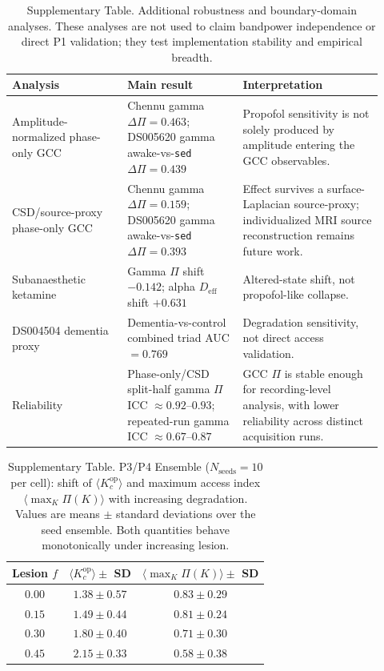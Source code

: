 \documentclass[11pt]{article}
\newcommand{\Deff}{D_{\mathrm{eff}}}
\begin{document}
\begin{table}[h]
\centering
\caption{Supplementary Table. Additional robustness and boundary-domain analyses. These analyses are not used to claim bandpower independence or direct P1 validation; they test implementation stability and empirical breadth.}
\label{tab:additional-controls}
\small
\begin{tabular}{p{0.29\linewidth}p{0.29\linewidth}p{0.34\linewidth}}
\toprule
Analysis & Main result & Interpretation \\
\midrule
Amplitude-normalized phase-only GCC & Chennu gamma $\Delta\Pi=0.463$; DS005620 gamma awake-vs-\texttt{sed} $\Delta\Pi=0.439$ & Propofol sensitivity is not solely produced by amplitude entering the GCC observables. \\
CSD/source-proxy phase-only GCC & Chennu gamma $\Delta\Pi=0.159$; DS005620 gamma awake-vs-\texttt{sed} $\Delta\Pi=0.393$ & Effect survives a surface-Laplacian source-proxy; individualized MRI source reconstruction remains future work. \\
Subanaesthetic ketamine & Gamma $\Pi$ shift $-0.142$; alpha $\Deff$ shift $+0.631$ & Altered-state shift, not propofol-like collapse. \\
DS004504 dementia proxy & Dementia-vs-control combined triad AUC $=0.769$ & Degradation sensitivity, not direct access validation. \\
Reliability & Phase-only/CSD split-half gamma $\Pi$ ICC $\approx0.92$--$0.93$; repeated-run gamma ICC $\approx0.67$--$0.87$ & GCC $\Pi$ is stable enough for recording-level analysis, with lower reliability across distinct acquisition runs. \\
\bottomrule
\end{tabular}
\end{table}

\begin{table}[t]
\centering
\caption{Supplementary Table. P3/P4 Ensemble ($N_{\mathrm{seeds}} = 10$ per cell): shift of $\langle K_c^{\mathrm{op}}\rangle$ and maximum access index $\langle\max_K \Pi(K)\rangle$ with increasing degradation. Values are means $\pm$ standard deviations over the seed ensemble. Both quantities behave monotonically under increasing lesion.}
\label{tab:v2}
\begin{tabular}{ccc}
\hline
Lesion $f$ & $\langle K_c^{\mathrm{op}}\rangle \pm $ SD & $\langle\max_K \Pi(K)\rangle \pm $ SD \\
\hline
$0.00$ & $1.38 \pm 0.57$ & $0.83 \pm 0.29$ \\
$0.15$ & $1.49 \pm 0.44$ & $0.81 \pm 0.24$ \\
$0.30$ & $1.80 \pm 0.40$ & $0.71 \pm 0.30$ \\
$0.45$ & $2.15 \pm 0.33$ & $0.58 \pm 0.38$ \\
\hline
\end{tabular}
\end{table}
\end{document}
